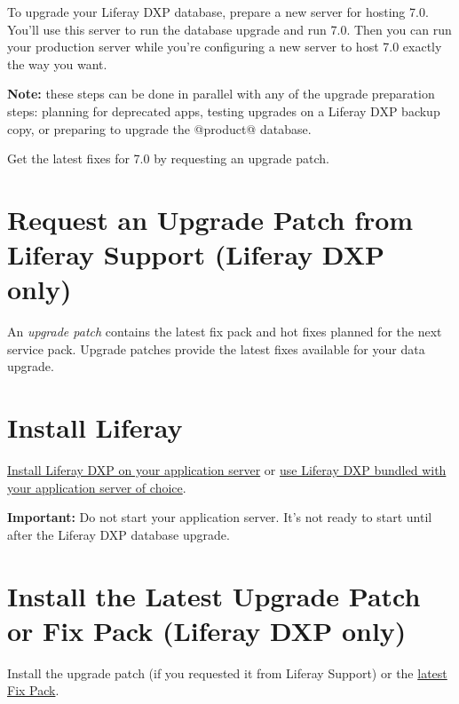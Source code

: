 To upgrade your Liferay DXP database, prepare a new server for hosting
7.0. You'll use this server to run the database upgrade and run 7.0.
Then you can run your production server while you're configuring a new
server to host 7.0 exactly the way you want.

\noindent\hrulefill

\textbf{Note:} these steps can be done in parallel with any of the
upgrade preparation steps: planning for deprecated apps, testing
upgrades on a Liferay DXP backup copy, or preparing to upgrade the
@product@ database.

\noindent\hrulefill

Get the latest fixes for 7.0 by requesting an upgrade patch.

\section{Request an Upgrade Patch from Liferay Support (Liferay DXP
only)}\label{request-an-upgrade-patch-from-liferay-support-liferay-dxp-only}

An \emph{upgrade patch} contains the latest fix pack and hot fixes
planned for the next service pack. Upgrade patches provide the latest
fixes available for your data upgrade.

\section{Install Liferay}\label{install-liferay}

\href{/docs/7-2/deploy/-/knowledge_base/d/deploying-product}{Install
Liferay DXP on your application server} or
\href{/docs/7-2/deploy/-/knowledge_base/d/installing-product}{use
Liferay DXP bundled with your application server of choice}.

\noindent\hrulefill

\textbf{Important:} Do not start your application server. It's not ready
to start until after the Liferay DXP database upgrade.

\noindent\hrulefill

\section{Install the Latest Upgrade Patch or Fix Pack (Liferay DXP
only)}\label{install-the-latest-upgrade-patch-or-fix-pack-liferay-dxp-only}

Install the upgrade patch (if you requested it from Liferay Support) or
the
\href{https://help.liferay.com/hc/en-us/articles/360028810452-Patching-Liferay-DXP}{latest
Fix Pack}.

